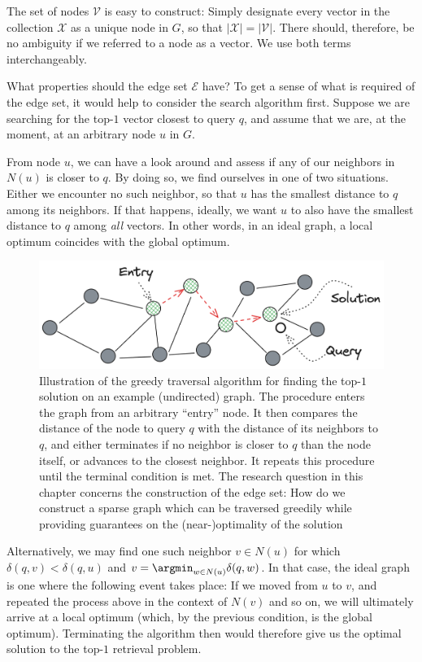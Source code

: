 \smallskip

The set of nodes $\mathcal{V}$ is easy to construct:
Simply designate every vector in the collection $\mathcal{X}$
as a unique node in $G$, so that $\lvert \mathcal{X} \rvert = \lvert \mathcal{V} \rvert$.
There should, therefore, be no ambiguity if we referred to a node
as a vector. We use both terms interchangeably.

What properties should the edge set $\mathcal{E}$ have?
To get a sense of what is required of the edge set,
it would help to consider the search algorithm first.
Suppose we are searching for the top-$1$ vector closest to query $q$,
and assume that we are, at the moment, at an arbitrary node $u$ in $G$.

From node $u$, we can have a look around and assess if any of our neighbors
in $N(u)$ is closer to $q$. By doing so, we find ourselves in one of two situations.
Either we encounter no such neighbor, so that $u$ has the smallest
distance to $q$ among its neighbors. If that happens, ideally, we want $u$ to also have
the smallest distance to $q$ among \emph{all} vectors. In other words, in an ideal graph,
a local optimum coincides with the global optimum.

\begin{figure}[t]
    \centering
    \includegraphics[width=0.7\linewidth]{figures/graphs-greedy-traversal.png}
    \caption{Illustration of the greedy traversal algorithm for finding
    the top-$1$ solution on an example (undirected) graph. The procedure enters
    the graph from an arbitrary ``entry'' node. It then compares the distance of the node to query $q$
    with the distance of its neighbors to $q$, and either terminates if no neighbor is closer
    to $q$ than the node itself, or advances to the closest neighbor. It repeats this procedure
    until the terminal condition is met. The research question in
    this chapter concerns the construction of the edge set: How do we construct a sparse graph
    which can be traversed greedily while providing guarantees on the (near-)optimality
    of the solution}
    \label{figure:graphs:greedy-traversal}
\end{figure}

Alternatively, we may find one such neighbor $v \in N(u)$ for which $\delta(q, v) < \delta(q, u)$
and $v = \argmin_{w \in N(u)} \delta(q, w)$.
In that case, the ideal graph is one where the following event takes place: If we moved from
$u$ to $v$, and repeated the process above in the context of $N(v)$ and so on, we will ultimately
arrive at a local optimum (which, by the previous condition, is the global optimum).
Terminating the algorithm then would therefore give us the optimal solution to the
top-$1$ retrieval problem.

